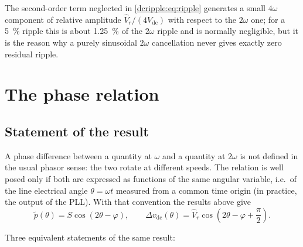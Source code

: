 The second-order term neglected in \eqref{dcripple:eq:ripple} generates a small
$4\omega$ component of relative amplitude $\hat V_r/(4V_{\mathrm{dc}})$ with
respect to the $2\omega$ one; for a \SI{5}{\percent} ripple this is about
\SI{1.25}{\percent} of the $2\omega$ ripple and is normally negligible, but it
is the reason why a purely sinusoidal $2\omega$ cancellation never gives exactly
zero residual ripple.

\section{The phase relation}

\subsection{Statement of the result}

A phase difference between a quantity at $\omega$ and a quantity at $2\omega$ is
not defined in the usual phasor sense: the two rotate at different speeds. The
relation is well posed only if both are expressed as functions of the same
angular variable, i.e.\ of the line electrical angle $\theta = \omega t$ measured
from a common time origin (in practice, the output of the PLL). With that
convention the results above give
\begin{equation}
  \tilde p(\theta) = S \cos(2\theta - \varphi),
  \qquad
  \Delta v_{\mathrm{dc}}(\theta) =
  \hat V_r \cos\!\left(2\theta - \varphi + \frac{\pi}{2}\right).
  \label{dcripple:eq:theta}
\end{equation}

Three equivalent statements of the same result:

